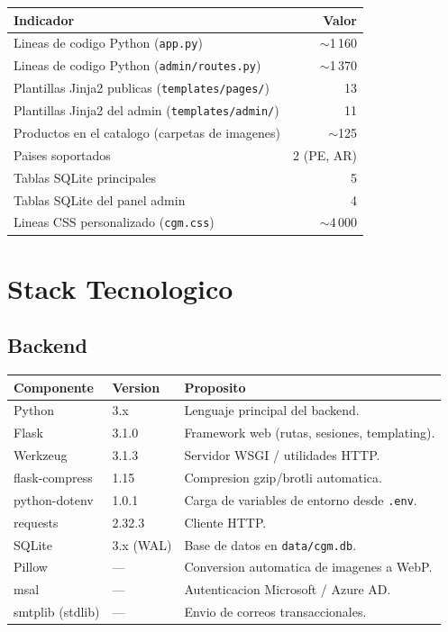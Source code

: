 \documentclass[11pt,a4paper]{article}
\begin{document}
\begin{center}
\begin{tabular}{l r}
\toprule
\textbf{Indicador} & \textbf{Valor} \\
\midrule
Lineas de codigo Python (\texttt{app.py})              & $\sim$1\,160 \\
Lineas de codigo Python (\texttt{admin/routes.py})     & $\sim$1\,370 \\
Plantillas Jinja2 publicas (\texttt{templates/pages/}) & 13 \\
Plantillas Jinja2 del admin (\texttt{templates/admin/}) & 11 \\
Productos en el catalogo (carpetas de imagenes)        & $\sim$125 \\
Paises soportados                                       & 2 (PE, AR) \\
Tablas SQLite principales                               & 5 \\
Tablas SQLite del panel admin                           & 4 \\
Lineas CSS personalizado (\texttt{cgm.css})            & $\sim$4\,000 \\
\bottomrule
\end{tabular}
\end{center}

\section{Stack Tecnologico}

\subsection{Backend}

\begin{longtable}{l l p{8cm}}
\toprule
\textbf{Componente} & \textbf{Version} & \textbf{Proposito} \\
\midrule
Python              & 3.x       & Lenguaje principal del backend. \\
Flask               & 3.1.0     & Framework web (rutas, sesiones, templating). \\
Werkzeug            & 3.1.3     & Servidor WSGI / utilidades HTTP. \\
flask-compress      & 1.15      & Compresion gzip/brotli automatica. \\
python-dotenv       & 1.0.1     & Carga de variables de entorno desde \texttt{.env}. \\
requests            & 2.32.3    & Cliente HTTP. \\
SQLite              & 3.x (WAL) & Base de datos en \texttt{data/cgm.db}. \\
Pillow              & ---       & Conversion automatica de imagenes a WebP. \\
msal                & ---       & Autenticacion Microsoft / Azure AD. \\
smtplib (stdlib)    & ---       & Envio de correos transaccionales. \\
\bottomrule
\end{longtable}
\end{document}
